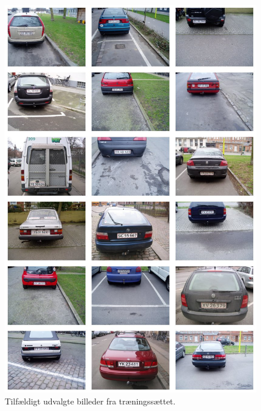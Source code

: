 \documentclass[11pt,a4paper,final]{article}
\begin{document}



\begin{figure}[htp]
\centering
\includegraphics[width=12cm]{appendix/illu/trainingset.jpg} 
\caption{Tilfældigt udvalgte billeder fra træningssættet.}
\label{fig:illu:trainingset}
\end{figure}
\end{document}
